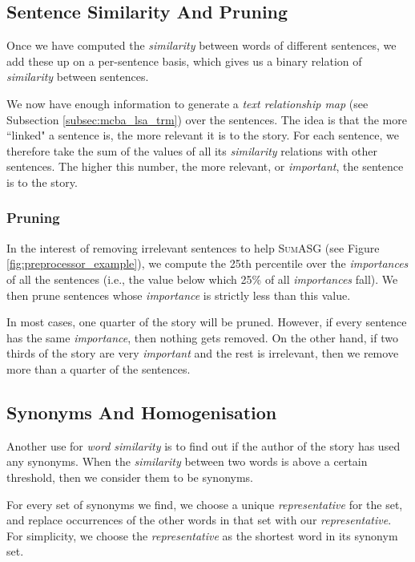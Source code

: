 \subsection{Sentence Similarity And Pruning}

Once we have computed the \textit{similarity} between words of different sentences, we add these up on a per-sentence basis, which gives us a binary relation of \textit{similarity} between sentences.

We now have enough information to generate a \textit{text relationship map} (see Subsection \ref{subsec:mcba_lsa_trm}) over the sentences. The idea is that the more ``linked" a sentence is, the more relevant it is to the story. For each sentence, we therefore take the sum of the values of all its \textit{similarity} relations with other sentences. The higher this number, the more relevant, or \textit{important}, the sentence is to the story.

\subsubsection*{Pruning}

In the interest of removing irrelevant sentences to help \textsc{SumASG} (see Figure \ref{fig:preprocessor_example}), we compute the 25th percentile over the \textit{importances} of all the sentences (i.e., the value below which 25\% of all \textit{importances} fall). We then prune sentences whose \textit{importance} is strictly less than this value.

In most cases, one quarter of the story will be pruned. However, if every sentence has the same \textit{importance}, then nothing gets removed. On the other hand, if two thirds of the story are very \textit{important} and the rest is irrelevant, then we remove more than a quarter of the sentences.

\subsection{Synonyms And Homogenisation}

Another use for \textit{word similarity} is to find out if the author of the story has used any synonyms. When the \textit{similarity} between two words is above a certain threshold, then we consider them to be synonyms.

For every set of synonyms we find, we choose a unique \textit{representative} for the set, and replace occurrences of the other words in that set with our \textit{representative}. For simplicity, we choose the \textit{representative} as the shortest word in its synonym set.

